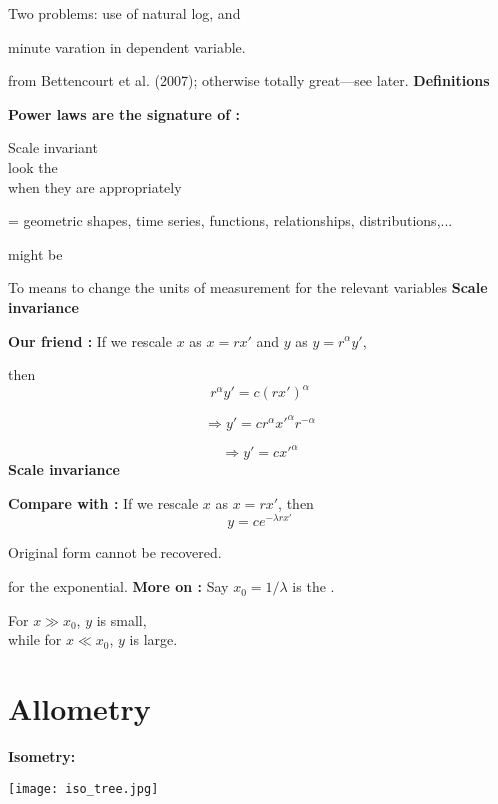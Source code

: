 Two problems:
use of natural log, and

minute varation in dependent variable.


{\small from Bettencourt et al. (2007)\cite{bettencourt2007a};
  otherwise totally great---see later.}
\textbf{Definitions}


\textbf{Power laws are the signature of :}
\bigskip

Scale invariant \\
look the \\ 
when they are 
appropriately 


\bigskip


 = geometric shapes, time series, functions, relationships, distributions,...

 might be 

To  means to change the units
of measurement for the relevant variables
\textbf{Scale invariance}

\textbf{Our friend :}
If we rescale $x$ as $x = rx'$ and $y$ as $y = r^\alpha y'$,

then
$$r^\alpha y' = c (rx')^{\alpha}$$

$$\Rightarrow y' = c r^{\alpha} {x'}^{\alpha}r^{-\alpha}$$

$$\Rightarrow y' = c {x'}^{\alpha}$$
\textbf{Scale invariance}

\textbf{Compare with :}
If we rescale $x$ as $x = rx'$, then
$$ y = c e^{-\lambda rx'} $$

Original form cannot be recovered.

 for the exponential.
\textbf{More on :}
Say $x_0 = 1/\lambda$ is the .

For $x \gg x_0$, $y$ is small,\\
while for $x \ll x_0$, $y$ is large.

\section{Allometry}      
\small

\textbf{Isometry:}

\begin{marginfigure}[]
  \texttt{[image: iso\_tree.jpg]}
\end{marginfigure}


